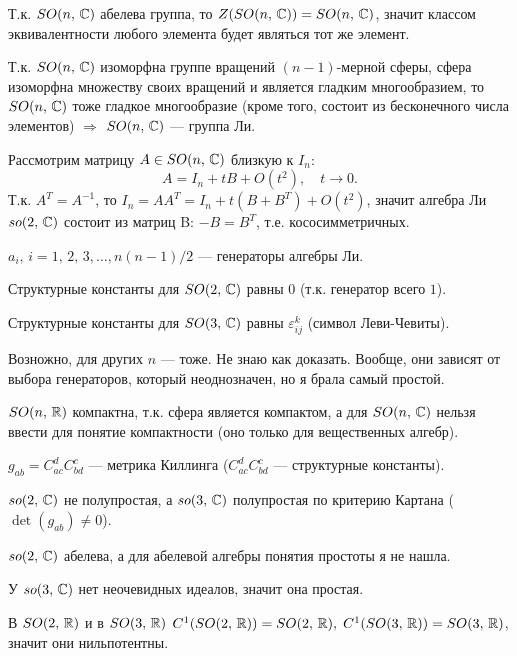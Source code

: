 \documentclass[a4paper,12pt]{article}
\begin{document}
	Т.к. $SO(n,\,\mathbb{C})$ абелева группа, то $ Z( SO(n,\,\mathbb{C}))= SO(n,\,\mathbb{C}) $,
	значит классом эквивалентности любого элемента будет являться тот же
	элемент.

	Т.к. $SO(n,\,\mathbb{C})$ изоморфна группе вращений $(n-1)$-мерной сферы,
	сфера изоморфна множеству своих вращений и является гладким
	многообразием, то $SO(n,\,\mathbb{C})$ тоже гладкое многообразие (кроме того,
	состоит из бесконечного числа элементов) $ \Rightarrow $  $SO(n,\,\mathbb{C})$
	--- группа Ли.

	Рассмотрим матрицу $ A\in SO(n,\,\mathbb{C}) $ близкую к $I_n$:
	\begin{equation}
		 A=I_n+tB+O(t^{2}),\quad t \to  0 
	.\end{equation}
	Т.к. $ A^{T}=A^{-1} $, то $ I_n=AA^{T}=I_n+t(B+B^{T})+
	O(t^{2})$, значит алгебра Ли $so(2,\,\mathbb{C})$ состоит из матриц B:
	$ -B=B^{T} $, т.е. кососимметричных.

	$ a_{i},\, i=1,\,2,\,3,\ldots, n(n-1) /2 $ --- генераторы алгебры Ли.

	Структурные константы для $SO(2,\,\mathbb{C})$ равны $0$ (т.к. генератор всего
	$1$).

	Структурные константы для $SO(3,\,\mathbb{C})$ равны $ \varepsilon_{ij}^{k} $
	(символ Леви-Чевиты).

	Возножно, для других $n$ --- тоже. Не знаю как доказать. Вообще, они
	зависят от выбора генераторов, который неоднозначен, но я брала самый
	простой.
	
	$SO(n,\,\mathbb{R})$ компактна, т.к. сфера является компактом, а для
	$SO(n,\,\mathbb{C})$ нельзя ввести для понятие компактности (оно только для
	вещественных алгебр).
	
	$ g_{ab}=C^{d}_{ac}C^{c}_{bd} $ --- метрика Киллинга
	($ C^{d}_{ac}C^{c}_{bd} $ --- структурные константы).

	$so(2,\,\mathbb{C})$ не полупростая, а $so(3,\,\mathbb{C})$ полупростая по критерию
	Картана ($ \det(g_{ab})\neq0 $).

	$so(2,\,\mathbb{C})$ абелева, а для абелевой алгебры понятия простоты я не
	нашла.

	У $so(3,\,\mathbb{C})$ нет неочевидных идеалов, значит она простая.

	В $SO(2,\,\mathbb{R})$ и в $SO(3,\,\mathbb{R})$ $ C^1(SO(2,\,\mathbb{R}))=SO(2,\,\mathbb{R}),\;
	C^1(SO(3,\,\mathbb{R}))=SO(3,\,\mathbb{R})$, значит они нильпотентны.
\end{document}
